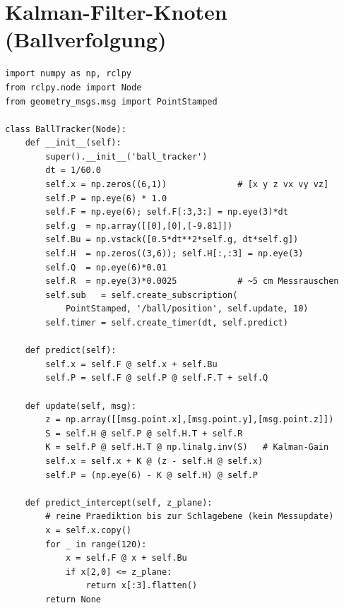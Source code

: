 
\chapter{Kalman-Filter-Knoten (Ballverfolgung)}

\begin{lstlisting}[style=py,caption={EKF/KF-Knoten: 3D-Position rein, geglättete Schätzung + Vorhersage raus}]
import numpy as np, rclpy
from rclpy.node import Node
from geometry_msgs.msg import PointStamped

class BallTracker(Node):
    def __init__(self):
        super().__init__('ball_tracker')
        dt = 1/60.0
        self.x = np.zeros((6,1))              # [x y z vx vy vz]
        self.P = np.eye(6) * 1.0
        self.F = np.eye(6); self.F[:3,3:] = np.eye(3)*dt
        self.g  = np.array([[0],[0],[-9.81]])
        self.Bu = np.vstack([0.5*dt**2*self.g, dt*self.g])
        self.H  = np.zeros((3,6)); self.H[:,:3] = np.eye(3)
        self.Q  = np.eye(6)*0.01
        self.R  = np.eye(3)*0.0025            # ~5 cm Messrauschen
        self.sub   = self.create_subscription(
            PointStamped, '/ball/position', self.update, 10)
        self.timer = self.create_timer(dt, self.predict)

    def predict(self):
        self.x = self.F @ self.x + self.Bu
        self.P = self.F @ self.P @ self.F.T + self.Q

    def update(self, msg):
        z = np.array([[msg.point.x],[msg.point.y],[msg.point.z]])
        S = self.H @ self.P @ self.H.T + self.R
        K = self.P @ self.H.T @ np.linalg.inv(S)   # Kalman-Gain
        self.x = self.x + K @ (z - self.H @ self.x)
        self.P = (np.eye(6) - K @ self.H) @ self.P

    def predict_intercept(self, z_plane):
        # reine Praediktion bis zur Schlagebene (kein Messupdate)
        x = self.x.copy()
        for _ in range(120):
            x = self.F @ x + self.Bu
            if x[2,0] <= z_plane:
                return x[:3].flatten()
        return None
\end{lstlisting}
